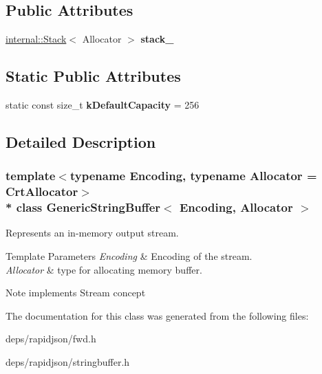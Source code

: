 \subsection*{Public Attributes}
\begin{DoxyCompactItemize}
\item 
\hyperlink{classinternal_1_1_stack}{internal\+::\+Stack}$<$ Allocator $>$ {\bfseries stack\+\_\+}\hypertarget{class_generic_string_buffer_ae3e087cd486715af2671d48f18985f4f}{}\label{class_generic_string_buffer_ae3e087cd486715af2671d48f18985f4f}

\end{DoxyCompactItemize}
\subsection*{Static Public Attributes}
\begin{DoxyCompactItemize}
\item 
static const size\+\_\+t {\bfseries k\+Default\+Capacity} = 256\hypertarget{class_generic_string_buffer_a930fbe5253870ecf919d2b909c9d679c}{}\label{class_generic_string_buffer_a930fbe5253870ecf919d2b909c9d679c}

\end{DoxyCompactItemize}


\subsection{Detailed Description}
\subsubsection*{template$<$typename Encoding, typename Allocator = Crt\+Allocator$>$\\*
class Generic\+String\+Buffer$<$ Encoding, Allocator $>$}

Represents an in-\/memory output stream. 


\begin{DoxyTemplParams}{Template Parameters}
{\em Encoding} & Encoding of the stream. \\
\hline
{\em Allocator} & type for allocating memory buffer. \\
\hline
\end{DoxyTemplParams}
\begin{DoxyNote}{Note}
implements Stream concept 
\end{DoxyNote}


The documentation for this class was generated from the following files\+:\begin{DoxyCompactItemize}
\item 
deps/rapidjson/fwd.\+h\item 
deps/rapidjson/stringbuffer.\+h\end{DoxyCompactItemize}
